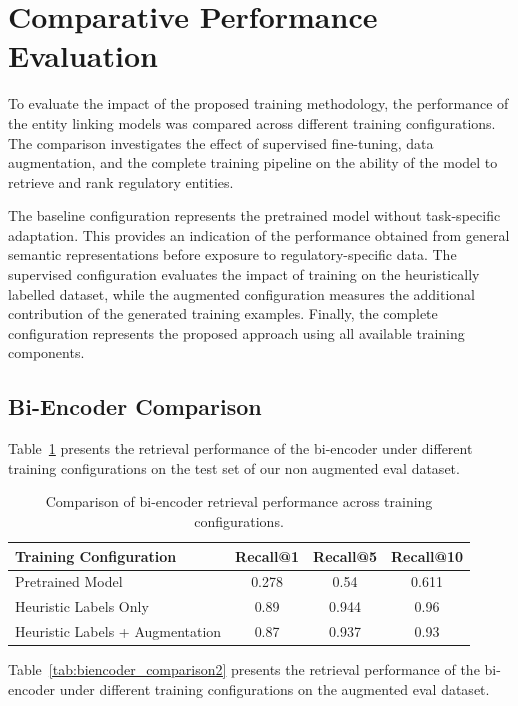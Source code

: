 \section{Comparative Performance Evaluation}

To evaluate the impact of the proposed training methodology, the performance of the entity linking models was compared across different training configurations. The comparison investigates the effect of supervised fine-tuning, data augmentation, and the complete training pipeline on the ability of the model to retrieve and rank regulatory entities.

The baseline configuration represents the pretrained model without task-specific adaptation. This provides an indication of the performance obtained from general semantic representations before exposure to regulatory-specific data. The supervised configuration evaluates the impact of training on the heuristically labelled dataset, while the augmented configuration measures the additional contribution of the generated training examples. Finally, the complete configuration represents the proposed approach using all available training components.

\subsection{Bi-Encoder Comparison}

Table~\ref{tab:biencoder_comparison} presents the retrieval performance of the bi-encoder under different training configurations on the test set of our non augmented eval dataset.

\begin{table}[H]
\centering
\caption{Comparison of bi-encoder retrieval performance across training configurations.}
\label{tab:biencoder_comparison}

\begin{tabular}{lccc}
\hline
\textbf{Training Configuration} & \textbf{Recall@1} & \textbf{Recall@5} & \textbf{Recall@10} \\
\hline
Pretrained Model & 0.278 & 0.54 & 0.611 \\
Heuristic Labels Only & 0.89 & 0.944 & 0.96 \\
Heuristic Labels + Augmentation & 0.87 & 0.937 & 0.93 \\
\hline
\end{tabular}
\end{table}

Table~\ref{tab:biencoder_comparison2} presents the retrieval performance of the bi-encoder under different training configurations on the augmented eval dataset.

